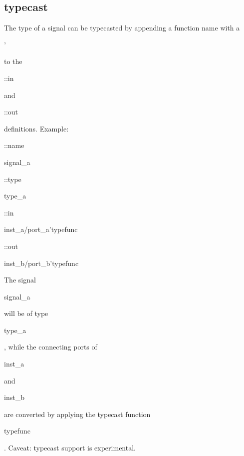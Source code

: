 \documentclass[a4paper,12pt]{article}
\begin{document}
\subsection{typecast}
The type of a signal can be typecasted by appending a function name with a \begin{tt}'\end{tt} to the \begin{tt}::in\end{tt} and \begin{tt}::out\end{tt} definitions.\newline
Example:\newline
\hspace*{20mm}\begin{tt}::name\end{tt}\hspace*{20mm}\begin{tt}signal\_a\end{tt}\newline
 \hspace*{20mm}\begin{tt}::type\end{tt}\hspace*{20mm}\begin{tt}type\_a\end{tt}\newline
 \hspace*{20mm}\begin{tt}::in\end{tt}\hspace*{24mm}\begin{tt}inst\_a/port\_a'typefunc\end{tt}\newline
 \hspace*{20mm}\begin{tt}::out\end{tt}\hspace*{22mm}\begin{tt}inst\_b/port\_b'typefunc\end{tt}\newline
\newline
The signal \begin{tt}signal\_a\end{tt} will be of type \begin{tt}type\_a\end{tt}, while the connecting ports of \begin{tt}inst\_a\end{tt} and \begin{tt}inst\_b\end{tt} are converted by applying the typecast function \begin{tt}typefunc\end{tt}.\newline
Caveat: typecast support is experimental.\newline
\end{document}
